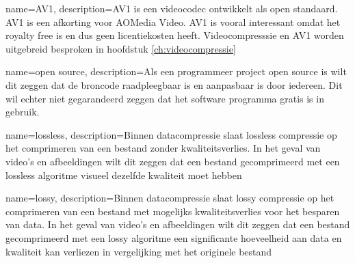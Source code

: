 {
	name={AV1},
	description={AV1 is een videocodec ontwikkelt als open standaard. AV1 is een afkorting voor AOMedia Video. AV1 is vooral interessant omdat het royalty free is en dus geen licentiekosten heeft. Videocompresssie en AV1 worden uitgebreid besproken in hoofdstuk \ref{ch:videocompressie}}
}

{
	name={open source},
	description={Als een programmeer project open source is wilt dit zeggen dat de broncode raadpleegbaar is en aanpasbaar is door iedereen. Dit wil echter niet gegarandeerd zeggen dat het software programma gratis is in gebruik.}
}

{
	name={lossless},
	description={Binnen datacompressie slaat lossless compressie op het comprimeren van een bestand zonder kwaliteitsverlies. In het geval van video's en afbeeldingen wilt dit zeggen dat een bestand gecomprimeerd met een lossless algoritme visueel dezelfde kwaliteit moet hebben}
}

{
	name={lossy},
	description={Binnen datacompressie slaat lossy compressie op het comprimeren van een bestand met mogelijks kwaliteitsverlies voor het besparen van data. In het geval van video's en afbeeldingen wilt dit zeggen dat een bestand gecomprimeerd met een lossy algoritme een significante hoeveelheid aan data en kwaliteit kan verliezen in vergelijking met het originele bestand}
}

